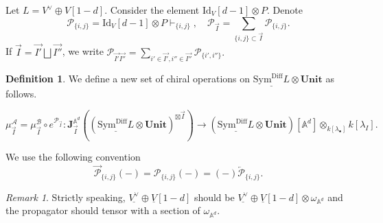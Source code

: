 \documentclass[11pt]{amsart}
\theoremstyle{definition}
\newtheorem{defn}[thm]{Definition}
\theoremstyle{remark}
\newtheorem{rem}[thm]{Remark}
\numberwithin{equation}{section}
\begin{document}
Let $L=V^{\vee}\oplus V[1-d]$. Consider the element $\mathrm{Id}_V[d-1]\otimes P$. Denote $$\mathcal{P}_{\{i,j\}}=\mathrm{Id}_V[d-1]\otimes P\vdash_{\{i,j\}},\quad \mathcal{P}_{\overrightarrow{I}}=\sum_{\{i,j\}\subset \overrightarrow{I}}\mathcal{P}_{\{i,j\}}.
$$
If $\overrightarrow{I}=\overrightarrow{I'}\bigsqcup \overrightarrow{I''}$, we write ${\mathcal{P}}_{\overrightarrow{I'}\overrightarrow{I''}}=\sum\limits_{i'\in \overrightarrow{I'}, i''\in\overrightarrow{I''} }\mathcal{P}_{\{i',i''\}}.$


\begin{defn}
We define a new set of chiral operations on $\underline{\mathrm{Sym}^{\mathrm{Diff}}L}\otimes \mathbf{Unit}$ as follows.

$$
\mu^{\mathcal{A}}_{\overrightarrow{I}}=\mu^{\mathcal{B}}_{\overrightarrow{I}}\circ e^{\mathcal{P}_{\overrightarrow{I}}}:\mathbf{J}^{\mathbb{A}^d}_{\overrightarrow{I}}\left((\underline{\mathrm{Sym}^{\mathrm{Diff}}L}\otimes \mathbf{Unit})^{\boxtimes\overrightarrow{I}} \right)\rightarrow (\underline{\mathrm{Sym}^{\mathrm{Diff}}L}\otimes \mathbf{Unit})[\mathbb{A}^d]\otimes_{k[\lambda_{\bullet}]}k[\lambda_{I}].
$$

\end{defn}

We use the following convention
$$
\overrightarrow{\mathcal{P}}_{\{i,j\}}(-)=\mathcal{P}_{\{i,j\}}(-)=(-)\overleftarrow{\mathcal{P}}_{\{i,j\}}.
$$


\begin{rem}
    Strictly speaking, $\underline{V^{\vee}}\oplus\underline{V}[1-d]$ should be $\underline{V^{\vee}}\oplus\underline{V}[1-d]\otimes \omega_{\mathbb{A}^d}$ and the propagator should tensor with a section of $\omega_{\mathbb{A}^d}$.
\end{rem}
\end{document}
